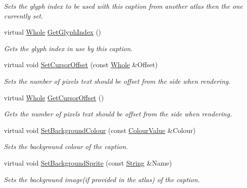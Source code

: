 \begin{DoxyCompactItemize}
\begin{DoxyCompactList}\small\item\em Sets the glyph index to be used with this caption from another atlas then the one currently set. \item\end{DoxyCompactList}\item 
virtual \hyperlink{namespacephys_a460f6bc24c8dd347b05e0366ae34f34a}{Whole} \hyperlink{classphys_1_1UI_1_1Caption_a4181591a3186ec4d1f87946891a0ef26}{GetGlyphIndex} ()
\begin{DoxyCompactList}\small\item\em Gets the glyph index in use by this caption. \item\end{DoxyCompactList}\item 
virtual void \hyperlink{classphys_1_1UI_1_1Caption_ae1b58390d4308f17dd204dbe38208b7d}{SetCursorOffset} (const \hyperlink{namespacephys_a460f6bc24c8dd347b05e0366ae34f34a}{Whole} \&Offset)
\begin{DoxyCompactList}\small\item\em Sets the number of pixels text should be offset from the side when rendering. \item\end{DoxyCompactList}\item 
virtual \hyperlink{namespacephys_a460f6bc24c8dd347b05e0366ae34f34a}{Whole} \hyperlink{classphys_1_1UI_1_1Caption_a381133922b882500ae0bf503acb4c6a4}{GetCursorOffset} ()
\begin{DoxyCompactList}\small\item\em Gets the number of pixels text should be offset from the side when rendering. \item\end{DoxyCompactList}\item 
virtual void \hyperlink{classphys_1_1UI_1_1Caption_a33ec6c09671474529b0f33f0f1cd51ad}{SetBackgroundColour} (const \hyperlink{classphys_1_1ColourValue}{ColourValue} \&Colour)
\begin{DoxyCompactList}\small\item\em Sets the background colour of the caption. \item\end{DoxyCompactList}\item 
virtual void \hyperlink{classphys_1_1UI_1_1Caption_a98422dc633dfb68ea87d0f54fda25f48}{SetBackgroundSprite} (const \hyperlink{namespacephys_aa03900411993de7fbfec4789bc1d392e}{String} \&Name)
\begin{DoxyCompactList}\small\item\em Sets the background image(if provided in the atlas) of the caption. \item\end{DoxyCompactList}\item 

\end{DoxyCompactItemize}
